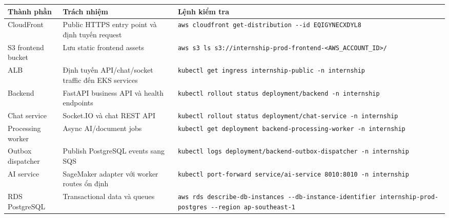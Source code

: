 {
\begingroup
\small
\setlength{\tabcolsep}{3pt}
\renewcommand{\arraystretch}{1.15}
\begin{longtable}{@{}
  >{\raggedright\arraybackslash}p{}
  >{\raggedright\arraybackslash}p{}
  >{\raggedright\arraybackslash}p{}@{}}
\toprule\noalign{}
\begin{minipage}[b]{\linewidth}\raggedright
Thành phần
\end{minipage} & \begin{minipage}[b]{\linewidth}\raggedright
Trách nhiệm
\end{minipage} & \begin{minipage}[b]{\linewidth}\raggedright
Lệnh kiểm tra
\end{minipage} \\
\midrule\noalign{}
\endhead
\bottomrule\noalign{}
\endlastfoot
CloudFront & Public HTTPS entry point và định tuyến request &
\texttt{aws\ cloudfront\ get-\allowbreak{}distribution\ -\/\allowbreak{}-id\ EQIGYNECXDYL8} \\
S3 frontend bucket & Lưu static frontend assets &
\texttt{aws\ s3\ ls\ s3://internship-prod-frontend-\textless{}AWS\_ACCOUNT\_ID\textgreater{}/} \\
ALB & Định tuyến API/chat/socket traffic đến EKS services &
\texttt{kubectl\ get\ ingress\ internship-\allowbreak{}public\ -n\ internship} \\
Backend & FastAPI business API và health endpoints &
\texttt{kubectl\ rollout\ status\ deployment/\allowbreak{}backend\ -n\ internship} \\
Chat service & Socket.IO và chat REST API &
\texttt{kubectl\ rollout\ status\ deployment/\allowbreak{}chat-\allowbreak{}service\ -n\ internship} \\
Processing worker & Async AI/document jobs &
\texttt{kubectl\ get\ deployment\ backend-\allowbreak{}processing-\allowbreak{}worker\ -n\ internship} \\
Outbox dispatcher & Publish PostgreSQL events sang SQS &
\texttt{kubectl\ logs\ deployment/\allowbreak{}backend-\allowbreak{}outbox-\allowbreak{}dispatcher\ -n\ internship} \\
AI service & SageMaker adapter với worker routes ổn định &
\texttt{kubectl\ port-\allowbreak{}forward\ service/\allowbreak{}ai-\allowbreak{}service\ 8010:8010\ -n\ internship} \\
RDS PostgreSQL & Transactional data và queues &
\texttt{aws\ rds\ describe-\allowbreak{}db-\allowbreak{}instances\ -\/\allowbreak{}-db-\allowbreak{}instance-\allowbreak{}identifier\ internship-\allowbreak{}prod-\allowbreak{}postgres\ -\/\allowbreak{}-region\ ap-\allowbreak{}southeast-\allowbreak{}1} \\

\end{longtable}}
